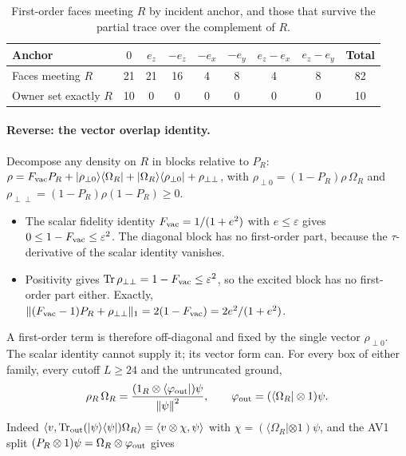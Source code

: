 \begin{table}[htbp]
\centering\small
\caption{First-order faces meeting $R$ by incident anchor, and those that
survive the partial trace over the complement of $R$.}
\label{tab:ay1-recount}
\begin{tabular}{lcccccccc}
\toprule
Anchor & $0$ & $e_z$ & $-e_z$ & $-e_x$ & $-e_y$ & $e_z-e_x$ & $e_z-e_y$ & Total\\
\midrule
Faces meeting $R$ & 21 & 21 & 16 & 4 & 8 & 4 & 8 & 82\\
Owner set exactly $R$ & 10 & 0 & 0 & 0 & 0 & 0 & 0 & 10\\
\bottomrule
\end{tabular}
\end{table}

\paragraph{Reverse: the vector overlap identity.}
Decompose any density on $R$ in blocks relative to $P_R$:
$\rho=F_{\rm vac}P_R+|\rho_{\perp0}\rangle\langle\Omega_R|
+|\Omega_R\rangle\langle\rho_{\perp0}|+\rho_{\perp\perp}$, with
$\rho_{\perp0}=(1-P_R)\rho\,\Omega_R$ and
$\rho_{\perp\perp}=(1-P_R)\rho(1-P_R)\ge0$.
\begin{itemize}
\item The scalar fidelity identity $F_{\rm vac}=1/(1+e^2)$ with
 $e\le\varepsilon$ gives $0\le1-F_{\rm vac}\le\varepsilon^2$. The diagonal
 block has no first-order part, because the $\tau$-derivative of the scalar
 identity vanishes.
\item Positivity gives $\operatorname{Tr}\rho_{\perp\perp}=1-F_{\rm vac}\le\varepsilon^2$,
 so the excited block has no first-order part either. Exactly,
 $\lVert (F_{\rm vac}-1)P_R+\rho_{\perp\perp}\rVert_1=2(1-F_{\rm vac})=2e^2/(1+e^2)$.
\end{itemize}
A first-order term is therefore off-diagonal and fixed by the single vector
$\rho_{\perp0}$. The scalar identity cannot supply it; its vector form can.
For every box of either family, every cutoff $L\ge24$ and the untruncated
ground,
\begin{equation}
 \rho_R\,\Omega_R=\frac{(1_R\otimes\langle\varphi_{\rm out}|)\psi}{\left\lVert\psi\right\rVert^2},
 \qquad \varphi_{\rm out}=(\langle\Omega_R|\otimes1)\psi .
 \label{eq:ay1-overlap}
\end{equation}
Indeed
$\langle v,\operatorname{Tr}_{\rm out}(|\psi\rangle\langle\psi|)\Omega_R\rangle=\langle v\otimes\chi,\psi\rangle$
with $\chi=(\langle\Omega_R|\otimes1)\psi$, and the AV1 split
$(P_R\otimes1)\psi=\Omega_R\otimes\varphi_{\rm out}$ gives
